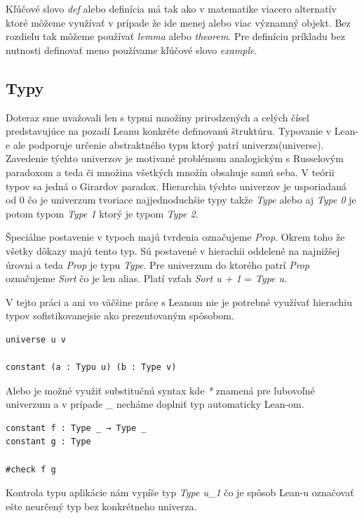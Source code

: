 \documentclass[a4paper,10pt,oneside]{report}%
\begin{document}
    Kľúčové slovo \emph{def} alebo definícia má tak ako v matematike viacero
alternatív ktoré môžeme využívať v prípade že ide menej alebo viac významný objekt.
    Bez rozdielu tak môžeme používať \emph{lemma} alebo \emph{theorem}.
    Pre definíciu príkladu bez nutnosti definovať meno používame kľúčové slovo
    \emph{example}.

\subsection{Typy}
    Doteraz sme uvažovali len s typmi množiny prirodzených a celých čísel
predstavujúce na pozadí Leanu konkréte definovanú štruktúru.
    Typovanie v Lean-e ale podporuje určenie abstraktného typu ktorý patrí univerzu(universe).
    Zavedenie týchto univerzov je motivané problémom analogickým s Russelovým paradoxom 
a teda či množina všetkých množín obsahuje samú seba.
    V teórii typov sa jedná o Girardov paradox.
    Hierarchia týchto univerzov je usporiadaná od 0 čo je univerzum tvoriace najjednoduchšie
typy takže \emph{Type} alebo aj \emph{Type 0} je potom typom \emph{Type 1} ktorý
je typom \emph{Type 2}.

    Špeciálne postavenie v typoch majú tvrdenia označujeme \emph{Prop}.
    Okrem toho že všetky dôkazy majú tento typ. 
    Sú postavené v hierachii oddelené na najnižšej úrovni a teda \emph{Prop} je 
typu \emph{Type}.
    Pre univerzum do ktorého patrí \emph{Prop} označujeme \emph{Sort} čo je len 
alias.
Platí vzťah \emph{Sort u + 1} = \emph{Type u}.

V tejto práci a ani vo väčšine práce s Leanom nie je potrebné využívať hierachiu
    typov sofistikovanejsie ako prezentovaným spôsobom.
\begin{lstlisting}
universe u v

constant (a : Typu u) (b : Type v)
\end{lstlisting}
Alebo je možné využiť substitučnú syntax kde \emph{*} znamená pre ľubovoľné univerzum
a v prípade \emph{\_} necháme doplniť typ automaticky Lean-om.
\begin{lstlisting}
constant f : Type _ → Type _
constant g : Type

#check f g
\end{lstlisting}
    Kontrola typu aplikácie nám vypíše typ \emph{Type u\_1} čo je spôsob Lean-u označovať
ešte neurčený typ bez konkrétneho univerza.
\end{document}
